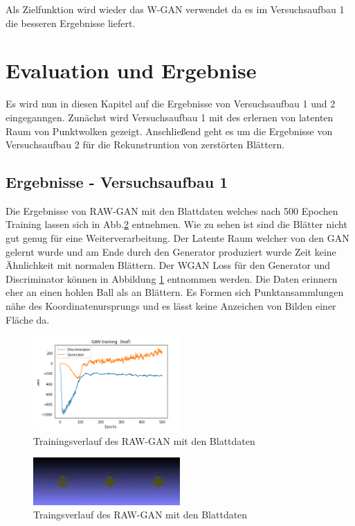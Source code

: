 \documentclass{llncs}
\begin{document}
Als Zielfunktion wird wieder das W-GAN verwendet da es im Versuchsaufbau 1 die besseren Ergebnisse liefert. 


\section{Evaluation und Ergebnise}
Es wird nun in diesen Kapitel auf die Ergebnisse von Versuchsaufbau 1 und 2 eingeganngen. Zunächst wird Versuchsaufbau 1 mit des erlernen von latenten Raum von Punktwolken gezeigt. Anschließend geht es um die Ergebnisse von Versuchsaufbau 2 für die Rekunstruntion von zerstörten Blättern. 

\subsection{Ergebnisse - Versuchsaufbau 1}

Die Ergebnisse von RAW-GAN mit den Blattdaten welches nach 500 Epochen Training lassen sich in Abb.\ref{fig:Bild56} entnehmen. Wie zu sehen ist sind die Blätter nicht gut genug für eine Weiterverarbeitung. Der Latente Raum welcher von den GAN gelernt wurde und am Ende durch den Generator produziert wurde Zeit keine Ähnlichkeit mit normalen Blättern. Der WGAN Loss für den Generator und Discriminator können in Abbildung \ref{fig:Bild55} entnommen werden.  Die Daten erinnern eher an einen hohlen Ball als an Blättern. Es Formen sich Punktansammlungen nähe des Koordinatenursprungs und es lässt keine Anzeichen von Bilden einer Fläche da. 
\begin{figure}[htbp] 
	\centering
	\includegraphics[width=0.5\textwidth]{raw_gan_leaf_result.png}
	\caption{Trainingsverlauf des RAW-GAN mit den Blattdaten}
	\label{fig:Bild55}
\end{figure}
\begin{figure}[htbp] 
	\centering
	\includegraphics[width=0.5\textwidth]{raw_gan_leaf_example.png}
	\caption{Traingsverlauf des RAW-GAN mit den Blattdaten}
	\label{fig:Bild56}
\end{figure}
\end{document}
